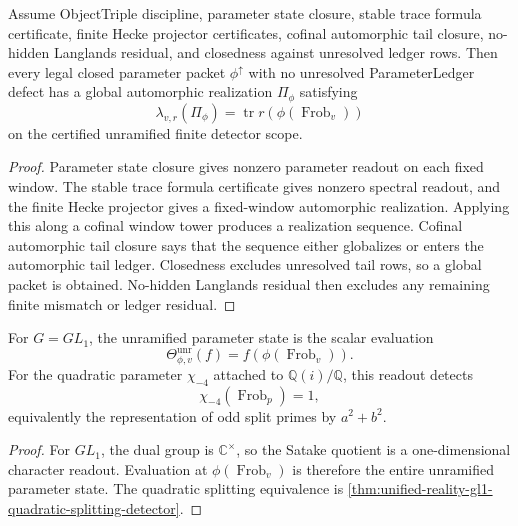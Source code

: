 \begin{theorem}
\label{thm:unified-reality-parameter-state-trace-tail-closure}
Assume ObjectTriple discipline, parameter state closure, stable trace
formula certificate, finite Hecke projector certificates, cofinal
automorphic tail closure, no-hidden Langlands residual, and closedness
against unresolved ledger rows. Then every legal closed parameter packet
$\phi^{\uparrow}$ with no unresolved ParameterLedger defect has a global
automorphic realization $\Pi_{\phi}$ satisfying
$$
\lambda_{v,r}(\Pi_{\phi})
=
\operatorname{tr}r(\phi(\operatorname{Frob}_v))
$$
on the certified unramified finite detector scope.
\end{theorem}
\begin{proof}
Parameter state closure gives nonzero parameter readout on each fixed
window. The stable trace formula certificate gives nonzero spectral
readout, and the finite Hecke projector gives a fixed-window
automorphic realization. Applying this along a cofinal window tower
produces a realization sequence. Cofinal automorphic tail closure says
that the sequence either globalizes or enters the automorphic tail
ledger. Closedness excludes unresolved tail rows, so a global packet is
obtained. No-hidden Langlands residual then excludes any remaining
finite mismatch or ledger residual.
\end{proof}

\begin{corollary}
\label{cor:unified-reality-abelian-parameter-state}
For $G=GL_1$, the unramified parameter state is the scalar evaluation
$$
\Theta_{\phi,v}^{\mathrm{unr}}(f)=f(\phi(\operatorname{Frob}_v)).
$$
For the quadratic parameter $\chi_{-4}$ attached to
$\mathbb Q(i)/\mathbb Q$, this readout detects
$$
\chi_{-4}(\operatorname{Frob}_p)=1,
$$
equivalently the representation of odd split primes by $a^2+b^2$.
\end{corollary}
\begin{proof}
For $GL_1$, the dual group is $\mathbb C^\times$, so the Satake quotient
is a one-dimensional character readout. Evaluation at
$\phi(\operatorname{Frob}_v)$ is therefore the entire unramified
parameter state. The quadratic splitting equivalence is
\autoref{thm:unified-reality-gl1-quadratic-splitting-detector}.
\end{proof}

